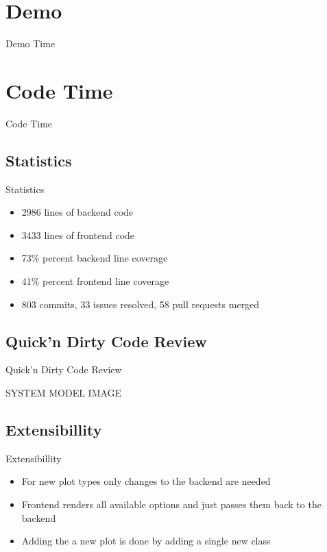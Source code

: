 \documentclass{beamer}
\begin{document}
\section{Demo}
\begin{frame}
  \begin{center}
    \Huge{Demo Time}
  \end{center}
\end{frame}

\section{Code Time}
\begin{frame}
  \begin{center}
    \Huge{Code Time}
  \end{center}
\end{frame}

\subsection{Statistics}
\begin{frame}{Statistics}
  \begin{itemize}
      \item 2986 lines of backend code
      \item 3433 lines of frontend code
      \item 73\% percent backend line coverage
      \item 41\% percent frontend line coverage
      \item 803 commits, 33 issues resolved, 58 pull requests merged
  \end{itemize}
\end{frame}

\subsection{Quick'n Dirty Code Review}
\begin{frame}{Quick'n Dirty Code Review}
  \begin{center}
    \large{SYSTEM MODEL IMAGE}
  \end{center}
\end{frame}

\subsection{Extensibillity}
\begin{frame}{Extensibillity}
  \begin{itemize}
    \item For new plot types only changes to the backend are needed
    \item Frontend renders all available options and just passes them back to the backend
    \item Adding the a new plot is done by adding a single new class
  \end{itemize}
\end{frame}
\end{document}
